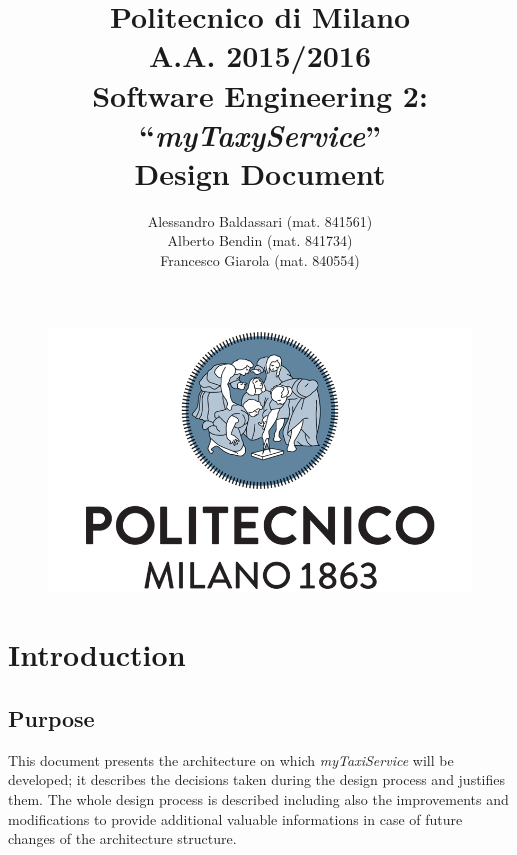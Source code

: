 \documentclass[a4paper,11pt]{report} %
\title{Politecnico di Milano\\A.A. 2015/2016\\Software Engineering 2: ``{\em myTaxyService}'' \\ \bigskip 
\textbf{D}esign \textbf{D}ocument}
\author{Alessandro Baldassari (mat. 841561) \\ Alberto Bendin (mat. 841734) \\ Francesco Giarola (mat. 840554)}
\newcommand{\mts}{\mbox{\normalfont\itshape myTaxiService}}
\begin{document}
	
	
	\begin{figure}[t]
		\centering
		\includegraphics[width=1\linewidth]{"Pictures/polimi-logo"}
		\label{fig:polimi-logo}
	\end{figure}
	
	\maketitle
		
	
	\thispagestyle{empty}
	\clearpage\mbox{}\clearpage

	
	
	
	\renewcommand*\thesection{\arabic{section}}
	\renewcommand*\thesubsection{\arabic{section}.\arabic{subsection}}
	\renewcommand*\thesubsubsection{%
	\arabic{section}.\arabic{subsection}.\arabic{subsubsection}%
	}
	\setcounter{secnumdepth}{4}
	\setcounter{tocdepth}{4}
		
	
	\tableofcontents
	\newpage
	
	
	
	\section{Introduction}
	
	\subsection{Purpose} This document presents the architecture on which \mts{} will be developed; it describes the decisions taken during the design process and justifies them. The whole design process is described including also the improvements and modifications to provide additional valuable informations in case of future changes of the architecture structure.
	
\end{document}
